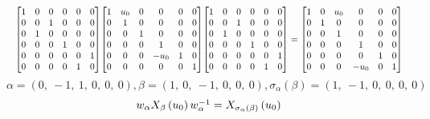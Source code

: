 \documentclass[11pt]{article}
\theoremstyle{definition}
\begin{document}
\[
\scaletoalign{\textwidth}{{\left[\begin{matrix}1 & 0 & 0 & 0 & 0 & 0\\0 & 0 & 1 & 0 & 0 & 0\\0 & 1 & 0 & 0 & 0 & 0\\0 & 0 & 0 & 1 & 0 & 0\\0 & 0 & 0 & 0 & 0 & 1\\0 & 0 & 0 & 0 & 1 & 0\end{matrix}\right]} {\left[\begin{matrix}1 & u_{0} & 0 & 0 & 0 & 0\\0 & 1 & 0 & 0 & 0 & 0\\0 & 0 & 1 & 0 & 0 & 0\\0 & 0 & 0 & 1 & 0 & 0\\0 & 0 & 0 & - u_{0} & 1 & 0\\0 & 0 & 0 & 0 & 0 & 1\end{matrix}\right]} {\left[\begin{matrix}1 & 0 & 0 & 0 & 0 & 0\\0 & 0 & 1 & 0 & 0 & 0\\0 & 1 & 0 & 0 & 0 & 0\\0 & 0 & 0 & 1 & 0 & 0\\0 & 0 & 0 & 0 & 0 & 1\\0 & 0 & 0 & 0 & 1 & 0\end{matrix}\right]} = {\left[\begin{matrix}1 & 0 & u_{0} & 0 & 0 & 0\\0 & 1 & 0 & 0 & 0 & 0\\0 & 0 & 1 & 0 & 0 & 0\\0 & 0 & 0 & 1 & 0 & 0\\0 & 0 & 0 & 0 & 1 & 0\\0 & 0 & 0 & - u_{0} & 0 & 1\end{matrix}\right]}}
\]
\[
\alpha = \left( 0, \  -1, \  1, \  0, \  0, \  0\right), \beta = \left( 1, \  0, \  -1, \  0, \  0, \  0\right), \sigma_{\alpha}(\beta) = \left( 1, \  -1, \  0, \  0, \  0, \  0\right)
\]
\[
\scaletoalign{\textwidth}{w_{\alpha} X_{\beta}\left(u_{0}\right) w_{\alpha}^{-1} = X_{\sigma_{\alpha}\left(\beta\right)}\left(u_{0}\right)}
\]
\end{document}
